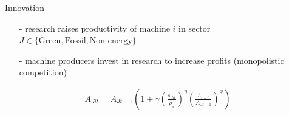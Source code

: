 \documentclass[11pt,aspectratio=169]{beamer}
\begin{document}
\begin{frame}{\hyperlink{modma}{Innovation}}
	\hypertarget{backinnov}{}
	\vspace{-2mm}
	\begin{itemize}[<+->]
		\item[-] research raises productivity of machine $i$ in sector $J\in\{\text{Green},\text{Fossil},\text{Non-energy}\}$ \vspace{-1mm}
		\item[-] machine producers invest in research to increase profits \small{(monopolistic competition)}
		\vspace{-1mm}
		\normalsize
	\end{itemize}
\pause
	\vspace{-1.4mm}
	\large
	\begin{align*}
		A_{Jit}={A_{Jt-1}}\left(1+\gamma\left(\frac{s_{Jit}}{\rho_J}\right)^\eta\left(\frac{A_{t-1}}{A_{Jt-1}}\right)^\phi\right)
	\end{align*}
	\normalsize
	\vspace{-1.9mm}
	\begin{enumerate}
	\item[] \  %
	\vspace{-1mm}
	\item[] \  %
	\vspace{-1mm}
	\item[] \
\end{enumerate}
\small
\vspace{4mm}
\hspace{-2mm}
\begin{minipage}[t!]{0.43\textwidth}
	\vspace{0mm}

\end{minipage}
\end{frame}
\end{document}
